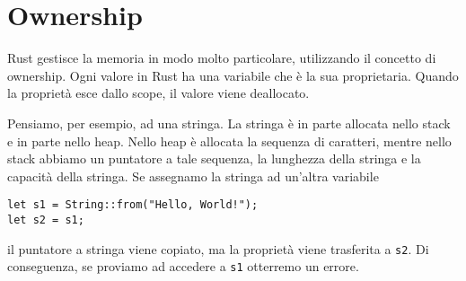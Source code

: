 \documentclass[12pt]{article}
\begin{document}
\section{Ownership}
Rust gestisce la memoria in modo molto particolare, utilizzando il concetto
di ownership. Ogni valore in Rust ha una variabile che è la sua proprietaria.
Quando la proprietà esce dallo scope, il valore viene deallocato.

Pensiamo, per esempio, ad una stringa. La stringa è in parte allocata nello stack
e in parte nello heap. Nello heap è allocata la sequenza di caratteri,
mentre nello stack abbiamo un puntatore a tale sequenza, la lunghezza della stringa
e la capacità della stringa. Se assegnamo la stringa ad un'altra variabile
\begin{verbatim}
let s1 = String::from("Hello, World!");
let s2 = s1;
\end{verbatim}
il puntatore a stringa viene copiato, ma la proprietà viene trasferita a \texttt{s2}.
Di conseguenza, se proviamo ad accedere a \texttt{s1} otterremo un errore.
\end{document}
